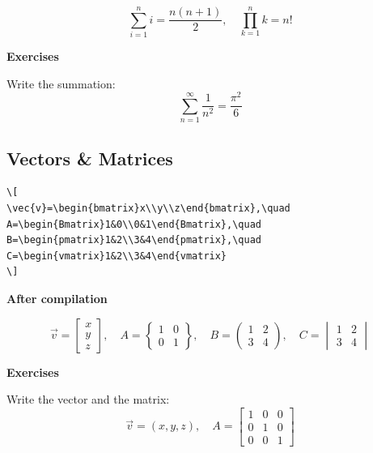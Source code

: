\documentclass[12pt,a4paper]{article}
\begin{document}
\[
\sum_{i=1}^{n}i=\frac{n(n+1)}{2}, \quad
\prod_{k=1}^{n}k=n!
\]

\textbf{\color[HTML]{CA6F1E}Exercises}

Write the summation:
\[
\sum_{n=1}^{\infty}\frac{1}{n^2}=\frac{\pi^2}{6}
\]

\subsection{Vectors \& Matrices}

\begin{verbatim}
\[
\vec{v}=\begin{bmatrix}x\\y\\z\end{bmatrix},\quad
A=\begin{Bmatrix}1&0\\0&1\end{Bmatrix},\quad
B=\begin{pmatrix}1&2\\3&4\end{pmatrix},\quad
C=\begin{vmatrix}1&2\\3&4\end{vmatrix}
\]
\end{verbatim}


\textbf{After compilation}

\[
\vec{v}=\begin{bmatrix}x\\y\\z\end{bmatrix},\quad
A=\begin{Bmatrix}1&0\\0&1\end{Bmatrix},\quad
B=\begin{pmatrix}1&2\\3&4\end{pmatrix},\quad
C=\begin{vmatrix}1&2\\3&4\end{vmatrix}
\]

\textbf{\color[HTML]{CA6F1E}Exercises}

Write the vector and the matrix:
\[
\vec{v}=(x,y,z),\quad 
A=
\begin{bmatrix}
1&0&0\\
0&1&0\\
0&0&1
\end{bmatrix}
\]
\end{document}
